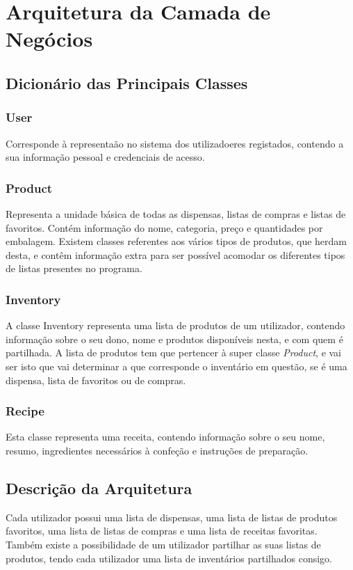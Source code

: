 \documentclass[a4paper]{report}
\begin{document}
\chapter{Arquitetura da Camada de Negócios}
    \section{Dicionário das Principais Classes}
        \subsection{User}
        Corresponde à representaão no sistema dos utilizadoeres registados,
        contendo a sua informação pessoal e credenciais de acesso.
        \subsection{Product}
        Representa a unidade básica de todas as dispensas, listas de compras e
        listas de favoritos. Contém informação do nome, categoria, preço e
        quantidades por embalagem. Existem classes referentes aos vários tipos
        de produtos, que herdam desta, e contêm informação extra para ser
        possível acomodar os diferentes tipos de listas presentes no programa.
        \subsection{Inventory}
        A classe Inventory representa uma lista de produtos de um utilizador, contendo
        informação sobre o seu dono, nome e produtos disponíveis nesta, e 
        com quem é partilhada. A lista de produtos tem que pertencer à super
        classe \textit{Product}, e vai ser isto que vai determinar a que
        corresponde o inventário em questão, se é uma dispensa, lista de
        favoritos ou de compras.
        \subsection{Recipe}
        Esta classe representa uma receita, contendo informação sobre o seu
        nome, resumo, ingredientes necessários à confeção e instruções de
        preparação.
    \section{Descrição da Arquitetura}
    Cada utilizador possui uma lista de dispensas, uma lista de listas de 
    produtos favoritos, uma lista de listas de compras e uma lista de receitas
    favoritas.
    Também existe a possibilidade de um utilizador partilhar as suas listas de
    produtos, tendo cada utilizador uma lista de inventários partilhados
    consigo.
\end{document}
